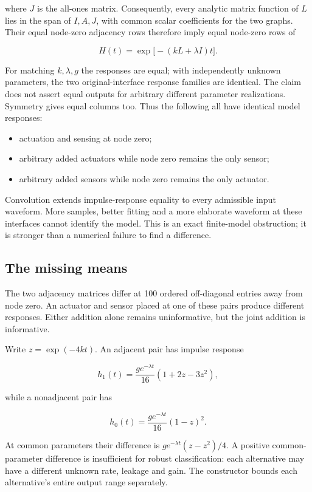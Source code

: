 \documentclass[
  11pt,
]{article}
\providecommand{\tightlist}{%
  \setlength{\itemsep}{0pt}\setlength{\parskip}{0pt}}
\begin{document}
where \(J\) is the all-ones matrix. Consequently, every analytic matrix
function of \(L\) lies in the span of \(I,A,J\), with common scalar
coefficients for the two graphs. Their equal node-zero adjacency rows
therefore imply equal node-zero rows of

\[H(t)=\exp\bigl[-(kL+\lambda I)t\bigr].\]

For matching \(k,\lambda,g\) the responses are equal; with independently
unknown parameters, the two original-interface response families are
identical. The claim does not assert equal outputs for arbitrary
different parameter realizations. Symmetry gives equal columns too. Thus
the following all have identical model responses:

\begin{itemize}
\tightlist
\item
  actuation and sensing at node zero;
\item
  arbitrary added actuators while node zero remains the only sensor;
\item
  arbitrary added sensors while node zero remains the only actuator.
\end{itemize}

Convolution extends impulse-response equality to every admissible input
waveform. More samples, better fitting and a more elaborate waveform at
these interfaces cannot identify the model. This is an exact
finite-model obstruction; it is stronger than a numerical failure to
find a difference.

\hypertarget{the-missing-means}{%
\subsection{The missing means}\label{the-missing-means}}

The two adjacency matrices differ at 100 ordered off-diagonal entries
away from node zero. An actuator and sensor placed at one of these pairs
produce different responses. Either addition alone remains
uninformative, but the joint addition is informative.

Write \(z=\exp(-4kt)\). An adjacent pair has impulse response

\[h_1(t)=\frac{g e^{-\lambda t}}{16}(1+2z-3z^2),\]

while a nonadjacent pair has

\[h_0(t)=\frac{g e^{-\lambda t}}{16}(1-z)^2.\]

At common parameters their difference is \(g e^{-\lambda t}(z-z^2)/4\).
A positive common-parameter difference is insufficient for robust
classification: each alternative may have a different unknown rate,
leakage and gain. The constructor bounds each alternative's entire
output range separately.
\end{document}

